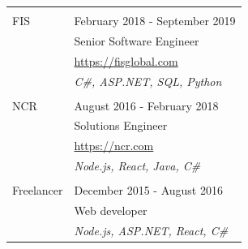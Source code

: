 \documentclass[a4paper]{article}
\begin{document}
\begin{tabular}{@{}l | l}
                   &                                                             \\
    FIS            & February 2018 - September 2019                              \\
                   & Senior Software Engineer                                    \\
                   & \href{https://fisglobal.com}{https://fisglobal.com}         \\
                   & \emph{C\#, ASP.NET, SQL, Python}                            \\
                   &                                                             \\
    NCR            & August 2016 - February 2018                                 \\
                   & Solutions Engineer                                          \\
                   & \href{https://ncr.com}{https://ncr.com}                     \\
                   & \emph{Node.js, React, Java, C\#}                            \\
                   &                                                             \\
    Freelancer     & December 2015 - August 2016                                 \\
                   & Web developer                                               \\
                   & \emph{Node.js, ASP.NET, React, C\#}                         \\
\end{tabular}
\end{document}
